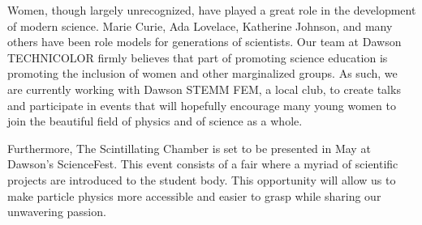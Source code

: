 Women, though largely unrecognized, have played a great role in the development of modern science. Marie Curie, Ada Lovelace, Katherine Johnson, and many others have been role models for generations of scientists. Our team at Dawson TECHNICOLOR firmly believes that part of promoting science education is promoting the inclusion of women and other marginalized groups. As such, we are currently working with Dawson STEMM FEM, a local club, to create talks and participate in events that will hopefully encourage many young women to join the beautiful field of physics and of science as a whole.

Furthermore, The Scintillating Chamber is set to be presented in May at Dawson’s ScienceFest. This event consists of a fair where a myriad of scientific projects are introduced to the student body. This opportunity will allow us to make particle physics more accessible and easier to grasp while sharing our unwavering passion.